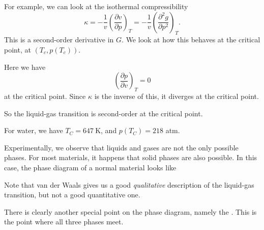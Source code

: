 \documentclass[a4paper]{article}
\begin{document}
For example, we can look at the isothermal compressibility
\[
  \kappa = -\frac{1}{v} \left(\frac{\partial v}{\partial p}\right)_T = -\frac{1}{v} \left(\frac{\partial^2 g}{\partial p^2}\right)_T.
\]
This is a second-order derivative in $G$. We look at how this behaves at the critical point, at $(T_c, p(T_c))$.
\begin{center}
\end{center}
Here we have
\[
  \left(\frac{\partial p}{\partial v}\right)_T = 0
\]
at the critical point. Since $\kappa$ is the inverse of this, it diverges at the critical point.

So the liquid-gas transition is second-order at the critical point.

\begin{eg}
  For water, we have $T_C = \SI{647}{\kelvin}$, and $p(T_C) = 218$ atm.
\end{eg}

Experimentally, we observe that liquids and gases are not the only possible phases. For most materials, it happens that solid phases are also possible. In this case, the phase diagram of a normal material looks like
\begin{center}
\end{center}
Note that van der Waals gives us a good \emph{qualitative} description of the liquid-gas transition, but not a good quantitative one.

There is clearly another special point on the phase diagram, namely the . This is the point where all three phases meet.
\end{document}
